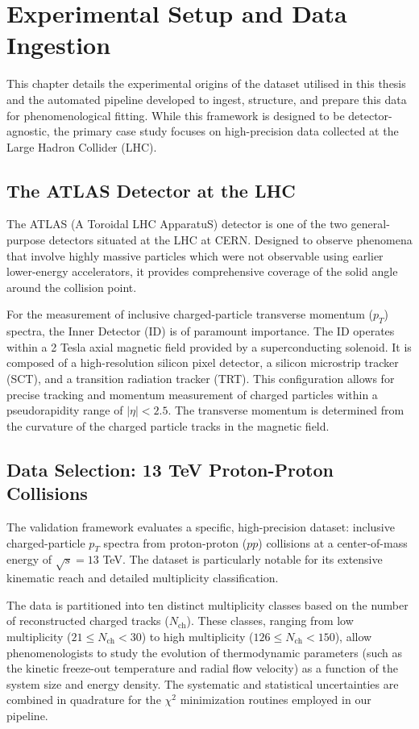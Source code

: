 \chapter{Experimental Setup and Data Ingestion}
\label{ch:experimental_setup}

This chapter details the experimental origins of the dataset utilised in this thesis and the automated pipeline developed to ingest, structure, and prepare this data for phenomenological fitting. While this framework is designed to be detector-agnostic, the primary case study focuses on high-precision data collected at the Large Hadron Collider (LHC).

\section{The ATLAS Detector at the LHC}
The ATLAS (A Toroidal LHC ApparatuS) detector is one of the two general-purpose detectors situated at the LHC at CERN. Designed to observe phenomena that involve highly massive particles which were not observable using earlier lower-energy accelerators, it provides comprehensive coverage of the solid angle around the collision point. 

For the measurement of inclusive charged-particle transverse momentum ($p_T$) spectra, the Inner Detector (ID) is of paramount importance. The ID operates within a 2 Tesla axial magnetic field provided by a superconducting solenoid. It is composed of a high-resolution silicon pixel detector, a silicon microstrip tracker (SCT), and a transition radiation tracker (TRT). This configuration allows for precise tracking and momentum measurement of charged particles within a pseudorapidity range of $|\eta| < 2.5$. The transverse momentum is determined from the curvature of the charged particle tracks in the magnetic field.

\section{Data Selection: 13 TeV Proton-Proton Collisions}
The validation framework evaluates a specific, high-precision dataset: inclusive charged-particle $p_T$ spectra from proton-proton ($pp$) collisions at a center-of-mass energy of $\sqrt{s} = 13$ TeV. The dataset is particularly notable for its extensive kinematic reach and detailed multiplicity classification.

The data is partitioned into ten distinct multiplicity classes based on the number of reconstructed charged tracks ($N_{\text{ch}}$). These classes, ranging from low multiplicity ($21 \leq N_{\text{ch}} < 30$) to high multiplicity ($126 \leq N_{\text{ch}} < 150$), allow phenomenologists to study the evolution of thermodynamic parameters (such as the kinetic freeze-out temperature and radial flow velocity) as a function of the system size and energy density. The systematic and statistical uncertainties are combined in quadrature for the $\chi^2$ minimization routines employed in our pipeline.

